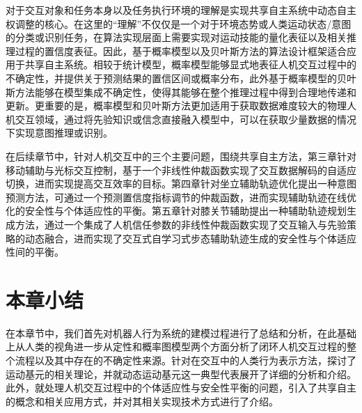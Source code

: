 对于交互对象和任务本身以及任务执行环境的理解是实现共享自主系统中动态自主权调整的核心。在这里的``理解''不仅仅是一个对于环境态势或人类运动状态/意图的分类或识别任务，在算法实现层面上需要实现对运动技能的量化表征以及相关推理过程的置信度表征。因此，基于概率模型以及贝叶斯方法的算法设计框架适合应用于共享自主系统。相较于统计模型，概率模型能够显式地表征人机交互过程中的不确定性，并提供关于预测结果的置信区间或概率分布，此外基于概率模型的贝叶斯方法能够在模型集成不确定性，使得其能够在整个推理过程中得到合理地传递和更新。更重要的是，概率模型和贝叶斯方法更加适用于获取数据难度较大的物理人机交互领域，通过将先验知识或信念直接融入模型中，可以在获取少量数据的情况下实现意图推理或识别。

在后续章节中，针对人机交互中的三个主要问题，围绕共享自主方法，第三章针对移动辅助与光标交互控制，基于一个非线性仲裁函数实现了交互数据解码的自适应切换，进而实现提高交互效率的目标。第四章针对坐立辅助轨迹优化提出一种意图预测方法，可通过一个预测置信度指标调节的仲裁函数，进而实现辅助轨迹在线优化的安全性与个体适应性的平衡。第五章针对膝关节辅助提出一种辅助轨迹规划生成方法，通过一个集成了人机信任参数的非线性仲裁函数实现了交互输入与先验策略的动态融合，进而实现了交互式自学习式步态辅助轨迹生成的安全性与个体适应性间的平衡。

\section{本章小结}
在本章节中，我们首先对机器人行为系统的建模过程进行了总结和分析，在此基础上从人类的视角进一步从定性和概率图模型两个方面分析了闭环人机交互过程的整个流程以及其中存在的不确定性来源。针对在交互中的人类行为表示方法，探讨了运动基元的相关理论，并就动态运动基元这一典型代表展开了详细的分析和介绍。此外，就处理人机交互过程中的个体适应性与安全性平衡的问题，引入了共享自主的概念和相关应用方式，并对其相关实现技术方式进行了介绍。